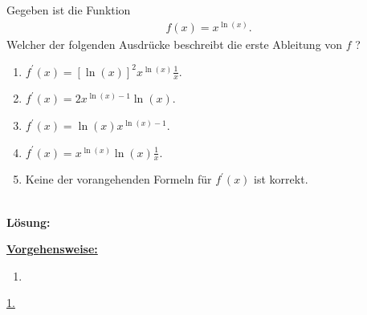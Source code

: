 \newpage
\subsection*{}
Gegeben ist die Funktion
\begin{align*}
	f(x) = x^{\ln(x)}.
\end{align*}
Welcher der folgenden Ausdrücke beschreibt die erste Ableitung von $ f $ ?
\renewcommand{\labelenumi}{(\alph{enumi})}
\begin{enumerate}
	\item 
	$ f^\prime(x) = [\ln(x)]^2 x^{\ln(x)} \frac{1}{x}$.
	\item
	$ f^\prime(x) =2 x^{\ln(x) -1} \ln(x) $.
	\item
	$ f^\prime(x) = \ln(x) x^{\ln(x) -1} $.
	\item
	$ f^\prime(x) =  x^{\ln(x) }\ln(x)\frac{1}{x} $.
	\item
	Keine der vorangehenden Formeln für $ f^\prime(x)  $ ist korrekt.
\end{enumerate}
\ \\
\textbf{Lösung:}
\begin{mdframed}
\underline{\textbf{Vorgehensweise:}}
\renewcommand{\labelenumi}{\theenumi.}
\begin{enumerate}
\item 
\end{enumerate}
\end{mdframed}
\underline{1. }\\


\newpage
